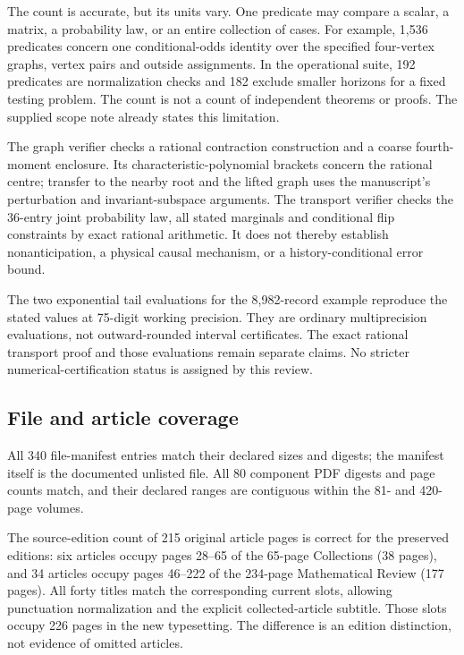 \documentclass[11pt,a4paper]{article}
\begin{document}
The count is accurate, but its units vary. One predicate may compare a scalar, a matrix, a probability law, or an entire collection of cases. For example, 1,536 predicates concern one conditional-odds identity over the specified four-vertex graphs, vertex pairs and outside assignments. In the operational suite, 192 predicates are normalization checks and 182 exclude smaller horizons for a fixed testing problem. The count is not a count of independent theorems or proofs. The supplied scope note already states this limitation.

The graph verifier checks a rational contraction construction and a coarse fourth-moment enclosure. Its characteristic-polynomial brackets concern the rational centre; transfer to the nearby root and the lifted graph uses the manuscript's perturbation and invariant-subspace arguments. The transport verifier checks the 36-entry joint probability law, all stated marginals and conditional flip constraints by exact rational arithmetic. It does not thereby establish nonanticipation, a physical causal mechanism, or a history-conditional error bound.

The two exponential tail evaluations for the 8,982-record example reproduce the stated values at 75-digit working precision. They are ordinary multiprecision evaluations, not outward-rounded interval certificates. The exact rational transport proof and those evaluations remain separate claims. No stricter numerical-certification status is assigned by this review.

\subsection{File and article coverage}
All 340 file-manifest entries match their declared sizes and digests; the manifest itself is the documented unlisted file. All 80 component PDF digests and page counts match, and their declared ranges are contiguous within the 81- and 420-page volumes.

The source-edition count of 215 original article pages is correct for the preserved editions: six articles occupy pages 28–65 of the 65-page Collections (38 pages), and 34 articles occupy pages 46–222 of the 234-page Mathematical Review (177 pages). All forty titles match the corresponding current slots, allowing punctuation normalization and the explicit collected-article subtitle. Those slots occupy 226 pages in the new typesetting. The difference is an edition distinction, not evidence of omitted articles.
\end{document}
